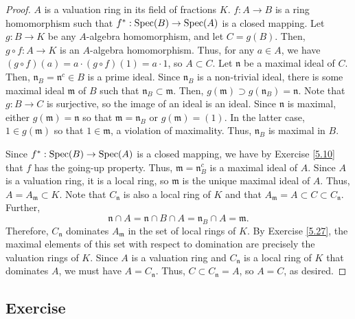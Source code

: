 \begin{proof}
$A$ is a valuation ring in its field of fractions $K$. $f : A \to B$ is a ring homomorphism such that $f^* : \operatorname{Spec}(B) \to \operatorname{Spec}(A)$ is
a closed mapping. Let $g : B \to K$ be any $A$-algebra homomorphism, and let $C = g(B)$. Then, $g \circ f : A \to K$ is an $A$-algebra
homomorphism. Thus, for any $a \in A$, we have $(g \circ f)(a) = a\cdot (g \circ f)(1) = a \cdot 1$, so $A \subset C$. Let $\mathfrak{n}$
be a maximal ideal of $C$. Then, $\mathfrak{n}_B = \mathfrak{n}^c \in B$ is a prime ideal. Since $\mathfrak{n}_B$ is a non-trivial ideal,
there is some maximal ideal $\mathfrak{m}$ of $B$ such that $\mathfrak{n}_B \subset \mathfrak{m}$. Then, $g(\mathfrak{m}) \supset g(\mathfrak{n}_B)
= \mathfrak{n}$. Note that $g: B \to C$ is surjective, so the image of an ideal is an ideal. Since $\mathfrak{n}$
is maximal, either $g(\mathfrak{m}) = \mathfrak{n}$ so that $\mathfrak{m} = \mathfrak{n}_B$ or $g(\mathfrak{m}) = (1)$. In the latter case,
$1 \in g(\mathfrak{m})$ so that $1 \in \mathfrak{m}$, a violation of maximality. Thus, $\mathfrak{n}_B$ is maximal in $B$.

Since $f^* : \operatorname{Spec}(B) \to \operatorname{Spec}(A)$ is a closed mapping, we have by Exercise \ref{5.10} that $f$ has the going-up property. Thus, 
$\mathfrak{m} = \mathfrak{n}_B^c$ is a maximal ideal of $A$. Since $A$ is a valuation ring, it is a local ring, so $\mathfrak{m}$
is the unique maximal ideal of $A$. Thus, $A = A_{\mathfrak{m}} \subset K$. Note that $C_{\mathfrak{n}}$ is also a local ring of $K$ 
and that $A_{\mathfrak{m}} = A \subset C \subset C_{\mathfrak{n}}$. Further,
$$\mathfrak{n} \cap A = \mathfrak{n} \cap B \cap A = \mathfrak{n}_B \cap A = \mathfrak{m}.$$
Therefore, $C_{\mathfrak{n}}$ dominates $A_{\mathfrak{m}}$ in the set of local rings of $K$. By Exercise \ref{5.27}, the maximal elements of this set
with respect to domination are precisely the valuation rings of $K$. Since $A$ is a valuation ring and $C_{\mathfrak{n}}$ is a local ring of $K$ that
dominates $A$, we must have $A = C_{\mathfrak{n}}$. Thus, $C \subset C_{\mathfrak{n}} = A$, so $A = C$, as desired.
\end{proof}

\subsection{Exercise}\label{5.35}

